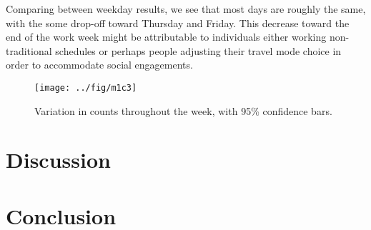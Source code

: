 \documentclass[12pt,letterpaper,article,twocolumn]{memoir}
\begin{document}
Comparing between weekday results, we see that most days are roughly
the same, with the some drop-off toward Thursday and Friday. This
decrease toward the end of the work week might be attributable to
individuals either working non-traditional schedules or perhaps people
adjusting their travel mode choice in order to accommodate social
engagements.

\begin{figure}[ht!]
  \centering
  \texttt{[image: ../fig/m1c3]}
  \caption{Variation in counts throughout the week, with 95\% confidence bars.}
  \label{fg:dayofweek}
\end{figure}

\clearpage
\section*{Discussion}



\section*{Conclusion}


\printbibliography
\end{document}
